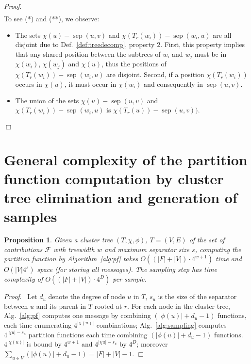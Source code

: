 \documentclass[10pt]{article}
\newtheorem{proposition}[theorem]{Proposition}
\newenvironment{proof}[1][]{\noindent \emph{Proof}\ifthenelse{\equal{#1}{}}{}{ (#1)}.~}{\hfill$\Box$}
\newcommand{\separator}[2]{\operatorname{sep}(#1,#2)}
\newcommand{\F}{\mathcal{F}}
\begin{document}
\begin{proof}
\begin{align*}
    \end{align*}
    To see (*) and (**), we observe:
    \begin{itemize}
    \item The sets $\chi(u)-\separator{u}{v}$ and
      $\chi(T_r(w_i))-\separator{w_i}{u}$ are all disjoint due to
      Def.~\ref{def:treedecomp}, property 2. First, this property implies
      that any shared position between the subtrees of $w_i$ and $w_j$
      must be in $\chi(w_i)$, $\chi(w_j)$ and $\chi(u)$, thus the
      positions of $\chi(T_r(w_i))-\separator{w_i}{u}$ are
      disjoint. Second, if a position $\chi(T_r(w_i))$ occurs in
      $\chi(u)$, it must occur in $\chi(w_i)$ and consequently in $\separator{u}{v}$.
    \item The union of the sets $\chi(u)-\separator{u}{v}$ and
      $\chi(T_r(w_i))-\separator{w_i}{u}$ is $\chi(T_r(u))-\separator{u}{v}).$
    \end{itemize}

    \end{proof}

    \section{General complexity of the partition function computation by cluster tree elimination and generation of samples}
    \label{appsec:algcomplexity}

    \begin{proposition}
      \label{prop:general-complexity}
    Given a cluster tree $(T,\chi,\phi)$, $T=(V,E)$ of the set of contributions $\F{}$ with treewidth $w$ and maximum separator size $s$, computing the partition function by Algorithm~\ref{alg:pf} takes $O((|F|+|V|)\cdot 4^{w+1})$ time and $O(|V| 4^s)$ space (for storing all messages). The sampling step has time complexity of $O((|F|+|V|)\cdot 4^D)$ per sample.
    \end{proposition}

    \begin{proof}[Proposition~\ref{prop:general-complexity}]
    Let $d_u$ denote the degree of node $u$ in $T$, $s_u$ is the size of the separator between
    $u$ and its parent in $T$ rooted at $r$. For each node in the cluster tree, Alg.~\ref{alg:pf} computes one message by combining $(|\phi(u)|+d_u-1)$ functions, each time enumerating $4^{|\chi(u)|}$ combinations; Alg.~\ref{alg:sampling} computes $4^{|\chi{u}|-s_u}$ partition functions each time combining $(|\phi(u)|+d_u-1)$ functions.  $4^{|\chi(u)|}$ is bound by $4^{w+1}$ and $4^{|\chi{u}|-s_u}$ by $4^D$; moreover $\sum_{u\in V} (|\phi(u)|+d_u-1) = |F|+|V|-1$.
    \end{proof}
\end{document}

